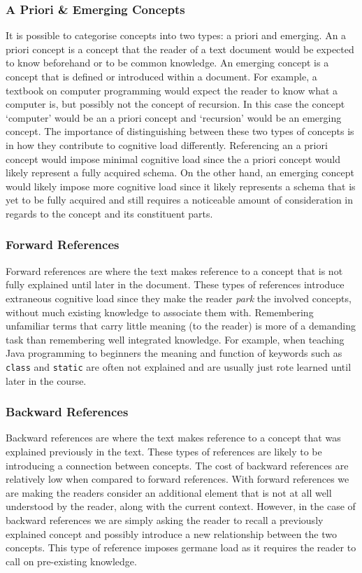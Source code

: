 \documentclass[12pt]{article}
\theoremstyle{grammarstyle}
\begin{document}
\subsubsection{A Priori \& Emerging Concepts}
It is possible to categorise concepts into two types: a priori and emerging.
An a priori concept is a concept that the reader of a text document would be expected to know beforehand or to be common knowledge.
An emerging concept is a concept that is defined or introduced within a document.
For example, a textbook on computer programming would expect the reader to know what a computer is, but possibly not the concept of recursion. In this case the concept `computer' would be an a priori concept and `recursion' would be an emerging concept.
The importance of distinguishing between these two types of concepts is in how they contribute to cognitive load differently. Referencing an a priori concept would impose minimal cognitive load since the a priori concept would likely represent a fully acquired schema. On the other hand, an emerging concept would likely impose more cognitive load since it likely represents a schema that is yet to be fully acquired and still requires a noticeable amount of consideration in regards to the concept and its constituent parts.

\subsubsection{Forward References}
Forward references are where the text makes reference to a concept that is not fully explained until later in the document. These types of references introduce extraneous cognitive load since they make the reader \textit{park} the involved concepts, without much existing knowledge to associate them with. Remembering unfamiliar terms that carry little meaning (to the reader) is more of a demanding task than remembering well integrated knowledge. For example, when teaching Java programming to beginners the meaning and function of keywords such as \texttt{class} and \texttt{static} are often not explained and are usually just rote learned until later in the course.

\subsubsection{Backward References}
Backward references are where the text makes reference to a concept that was explained previously in the text. These types of references are likely to be introducing a connection between concepts. The cost of backward references are relatively low when compared to forward references. With forward references we are making the readers consider an additional element that is not at all well understood by the reader, along with the current context. However, in the case of backward references we are simply asking the reader to recall a previously explained concept and possibly introduce a new relationship between the two concepts. This type of reference imposes germane load as it requires the reader to call on pre-existing knowledge.
\end{document}
